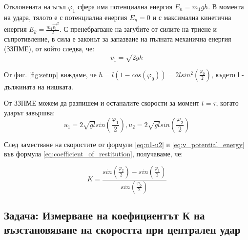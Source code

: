 \documentclass[12pt]{article}
\begin{document}
Отклонената на ъгъл \(\varphi_1\) сфера има потенциална енергия \(E_n = m_1gh\). В момента на удара, тялото е с потенциална енергия \(E_n = 0\) и с максимална кинетична енергия \(E_k = \frac{m_1 \vec{v_1}^2}{2}\). С пренебрагване на загубите от силите на триене и съпротивление, в сила е законът за запазване на пълната механична енергия (ЗЗПМЕ), от който следва, че:
\begin{equation}\label{eq:v_potential_energy}
    v_1 = \sqrt{2gh}
\end{equation}

От фиг. \ref{fig:setup} виждаме, че \(h = l(1 - cos(\varphi_0)) = 2lsin^2(\frac{\varphi_0}{2})\), където l - дължината на нишката. 

От ЗЗПМЕ можем да разпишем и останалите скорости за момент \(t=\tau\), когато ударът завършва:
\begin{equation}\label{eq:u1-u2}
    u_1 = 2\sqrt{gl}sin(\frac{\varphi_1}{2}),
    u_2 = 2\sqrt{gl}sin(\frac{\varphi_2}{2})
\end{equation}

След заместване на скоростите от формули \ref{eq:u1-u2} и \ref{eq:v_potential_energy} във формула \ref{eq:coefficient_of_restitution}, получаваме, че:

\begin{equation}
    K = \frac{sin(\frac{\varphi_2}{2}) - sin(\frac{\varphi_1}{2})}{sin(\frac{\varphi_0}{2})}
\end{equation}


\subsection{Задача: Измерване на коефициентът К на възстановяване на скоростта при централен удар}
\end{document}
